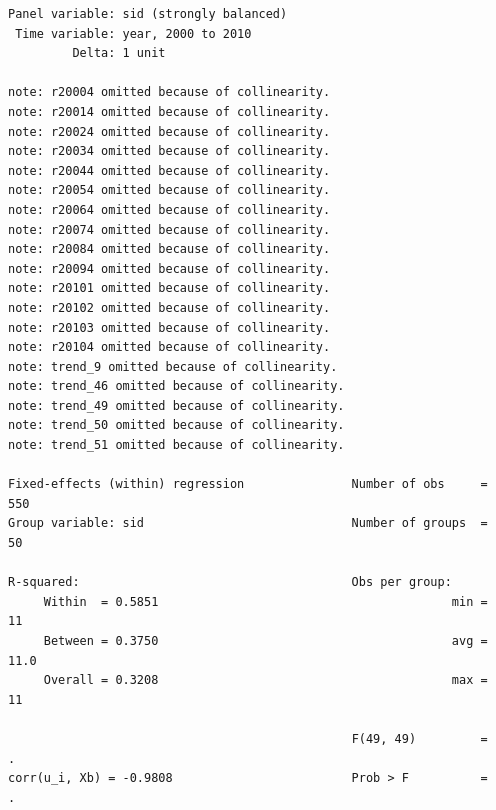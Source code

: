 \documentclass[
]{book}
\begin{document}
\begin{verbatim}
Panel variable: sid (strongly balanced)
 Time variable: year, 2000 to 2010
         Delta: 1 unit

note: r20004 omitted because of collinearity.
note: r20014 omitted because of collinearity.
note: r20024 omitted because of collinearity.
note: r20034 omitted because of collinearity.
note: r20044 omitted because of collinearity.
note: r20054 omitted because of collinearity.
note: r20064 omitted because of collinearity.
note: r20074 omitted because of collinearity.
note: r20084 omitted because of collinearity.
note: r20094 omitted because of collinearity.
note: r20101 omitted because of collinearity.
note: r20102 omitted because of collinearity.
note: r20103 omitted because of collinearity.
note: r20104 omitted because of collinearity.
note: trend_9 omitted because of collinearity.
note: trend_46 omitted because of collinearity.
note: trend_49 omitted because of collinearity.
note: trend_50 omitted because of collinearity.
note: trend_51 omitted because of collinearity.

Fixed-effects (within) regression               Number of obs     =        550
Group variable: sid                             Number of groups  =         50

R-squared:                                      Obs per group:
     Within  = 0.5851                                         min =         11
     Between = 0.3750                                         avg =       11.0
     Overall = 0.3208                                         max =         11

                                                F(49, 49)         =          .
corr(u_i, Xb) = -0.9808                         Prob > F          =          .


\end{verbatim}
\end{document}
